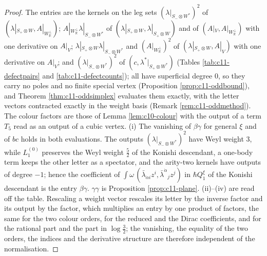 \begin{proof}
The entries are the kernels on the leg sets $(\lambda|_{S_-\otimes W^*})^2$ of $(\lambda|_{S_+\otimes W},A|_{W_{\mathbb R}^\perp})$; $A|_{W_{\mathbb R}^\perp}\lambda|_{S_-\otimes W^*}$ of $(\lambda|_{S_+\otimes W},\lambda|_{S_+\otimes W})$ and of $(A|_V,A|_{W_{\mathbb R}^\perp})$ with one derivative on $A|_V$; $\lambda|_{S_+\otimes W}\lambda|_{S_-\otimes W^*}$ and $(A|_{W_{\mathbb R}^\perp})^2$ of $(\lambda|_{S_+\otimes W},A|_V)$ with one derivative on $A|_V$; and $(\lambda|_{S_-\otimes W^*})^2$ of $(c,\lambda^*|_{S_+\otimes W^*})$ (Tables \ref{tab:c11-defectpairs} and \ref{tab:c11-defectcounts}); all have superficial degree $0$, so they carry no poles and no finite special vertex (Proposition \ref{prop:c11-oddbound}), and Theorem \ref{thm:c11-oddsimplex} evaluates them exactly, with the letter vectors contracted exactly in the weight basis (Remark \ref{rem:c11-oddmethod}). The colour factors are those of Lemma \ref{lem:c10-colour} with the output of a term $T_5$ read as an output of a cubic vertex. (i) The vanishing of $\beta\gamma$ for general $\xi$ and of $bc$ holds in both evaluations. The outputs $(\lambda|_{S_-\otimes W^*})^2$ have Weyl weight $3$, while $L_1^{(0)}$ preserves the Weyl weight $\tfrac52$ of the Konishi descendant, a one-body term keeps the other letter as a spectator, and the arity-two kernels have outputs of degree $-1$; hence the coefficient of $\int\omega\,(\bar\lambda_{\dot\alpha i}z^i,\bar\lambda^{\dot\alpha}{}_jz^j)$ in $\hbar Q^\xi_1$ of the Konishi descendant is the entry $\beta\gamma$. $\gamma\gamma$ is Proposition \ref{prop:c11-plane}. (ii)--(iv) are read off the table. Rescaling a weight vector rescales its letter by the inverse factor and its output by the factor, which multiplies an entry by one product of factors, the same for the two colour orders, for the reduced and the Dirac coefficients, and for the rational part and the part in $\log\tfrac32$; the vanishing, the equality of the two orders, the indices and the derivative structure are therefore independent of the normalisation.
\end{proof}

